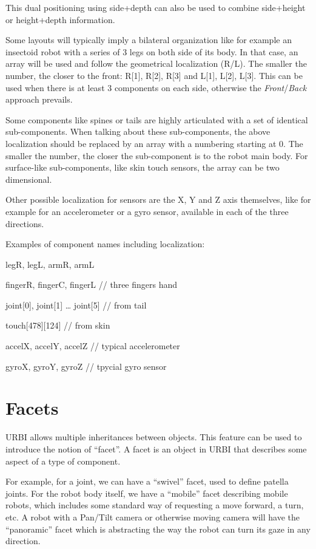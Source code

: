 \documentclass[a4paper]{article}
\begin{document}
{\sffamily
This dual positioning using side+depth can also be used to combine
side+height or height+depth information.}

{\sffamily
Some layouts will typically imply a bilateral organization like for
example an insectoid robot with a series of 3 legs on both side of its
body. In that case, an array will be used and follow the geometrical
localization (R/L). The smaller the number, the closer to the front:
R[1], R[2], R[3] and L[1], L[2], L[3]. This can be used when there is
at least 3 components on each side, otherwise the
\textit{Front}/\textit{Back} approach prevails.}

{\sffamily
Some components like spines or tails are highly articulated with a set
of identical sub-components. When talking about these sub-components,
the above localization should be replaced by an array with a numbering
starting at 0. The smaller the number, the closer the sub-component is
to the robot main body. For surface-like sub-components, like skin
touch sensors, the array can be two dimensional.}

{\sffamily
Other possible localization for sensors are the X, Y and Z axis
themselves, like for example for an accelerometer or a gyro sensor,
available in each of the three directions.}

{\sffamily
Examples of component names including localization:}

{
legR, legL, armR, armL}

{
fingerR, fingerC, fingerL // three fingers hand}

{
joint[0], joint[1] … joint[5] // from tail}

{
touch[478][124] // from skin}

{
accelX, accelY, accelZ // typical accelerometer}

{
gyroX, gyroY, gyroZ // tpycial gyro sensor}

\section[]{}
\section[Facets]{Facets}
{\sffamily
URBI allows multiple inheritances between objects. This feature can be
used to introduce the notion of “facet”. A facet is an object in URBI
that describes some aspect of a type of component. }

{\sffamily
For example, for a joint, we can have a “swivel” facet, used to define
patella joints. For the robot body itself, we have a “mobile” facet
describing mobile robots, which includes some standard way of
requesting a move forward, a turn, etc. A robot with a Pan/Tilt camera
or otherwise moving camera will have the “panoramic” facet which is
abstracting the way the robot can turn its gaze in any direction.}
\end{document}
